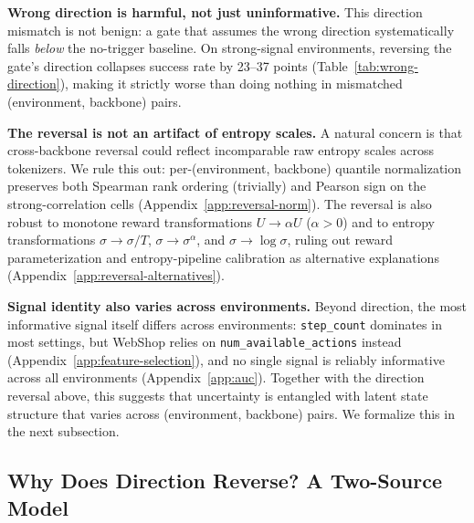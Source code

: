 \textbf{Wrong direction is harmful, not just uninformative.}
This direction mismatch is not benign: a gate that assumes the wrong direction systematically falls \emph{below} the no-trigger baseline. On strong-signal environments, reversing the gate's direction collapses success rate by 23–37 points (Table~\ref{tab:wrong-direction}), making it strictly worse than doing nothing in mismatched (environment, backbone) pairs.

\textbf{The reversal is not an artifact of entropy scales.}
A natural concern is that cross-backbone reversal could reflect incomparable raw entropy scales across tokenizers. We rule this out: per-(environment, backbone) quantile normalization preserves both Spearman rank ordering (trivially) and Pearson sign on the strong-correlation cells (Appendix~\ref{app:reversal-norm}). The reversal is also robust to monotone reward transformations $U \!\to\! \alpha U$ ($\alpha > 0$) and to entropy transformations $\sigma \!\to\! \sigma/T$, $\sigma \!\to\! \sigma^\alpha$, and $\sigma \!\to\! \log\sigma$, ruling out reward parameterization and entropy-pipeline calibration as alternative explanations (Appendix~\ref{app:reversal-alternatives}).

\textbf{Signal identity also varies across environments.}
Beyond direction, the most informative signal itself differs across environments: \texttt{step\_count} dominates in most settings, but WebShop relies on \texttt{num\_available\_actions} instead (Appendix~\ref{app:feature-selection}), and no single signal is reliably informative across all environments (Appendix~\ref{app:auc}). Together with the direction reversal above, this suggests that uncertainty is entangled with latent state structure that varies across (environment, backbone) pairs. We formalize this in the next subsection.

\subsection{Why Does Direction Reverse? A Two-Source Model}
\label{sec:toy-model}

